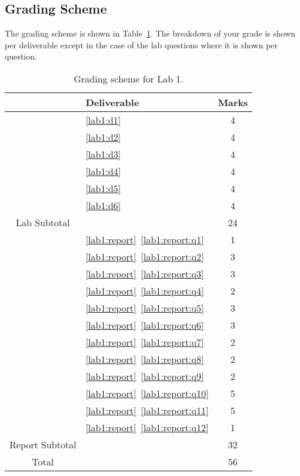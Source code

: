 \subsection{Grading Scheme}
The grading scheme is shown in Table~\ref{tab:lab1:grading}. The breakdown of
your grade is shown per deliverable except in the case of the lab
questions where it is shown per question.
%
\begin{table} [H]
\centering
\caption[Grading Scheme for Lab 1]{Grading scheme for Lab 1.}
\label{tab:lab1:grading}
\begin{tabular}{c|l|c}
        & Deliverable           & Marks  \\ \hline
        & \ref{lab1:d1}         & 4       \\ \hline
        & \ref{lab1:d2}         & 4       \\ \hline
        & \ref{lab1:d3}         & 4       \\ \hline
        & \ref{lab1:d4}         & 4       \\ \hline
        & \ref{lab1:d5}         & 4       \\ \hline
        & \ref{lab1:d6}         & 4       \\ \hhline{=|=|=}
Lab Subtotal&                       & 24      \\ \hhline{=|=|=}
        & \ref{lab1:report}~\ref{lab1:report:q1}  & 1       \\ \hline
        & \ref{lab1:report}~\ref{lab1:report:q2}  & 3       \\ \hline
        & \ref{lab1:report}~\ref{lab1:report:q3}  & 3       \\ \hline
        & \ref{lab1:report}~\ref{lab1:report:q4}  & 2       \\ \hline
        & \ref{lab1:report}~\ref{lab1:report:q5}  & 3       \\ \hline
        & \ref{lab1:report}~\ref{lab1:report:q6}  & 3       \\ \hline
        & \ref{lab1:report}~\ref{lab1:report:q7}  & 2       \\ \hline
        & \ref{lab1:report}~\ref{lab1:report:q8}  & 2       \\ \hline
        & \ref{lab1:report}~\ref{lab1:report:q9}  & 2       \\ \hline
        & \ref{lab1:report}~\ref{lab1:report:q10} & 5       \\ \hline
        & \ref{lab1:report}~\ref{lab1:report:q11} & 5       \\ \hline
        & \ref{lab1:report}~\ref{lab1:report:q12} & 1       \\ \hhline{=|=|=}
Report Subtotal&  & 32 \\ \hhline{=|=|=}
  Total &                       & 56
\end{tabular}
\end{table}
%
